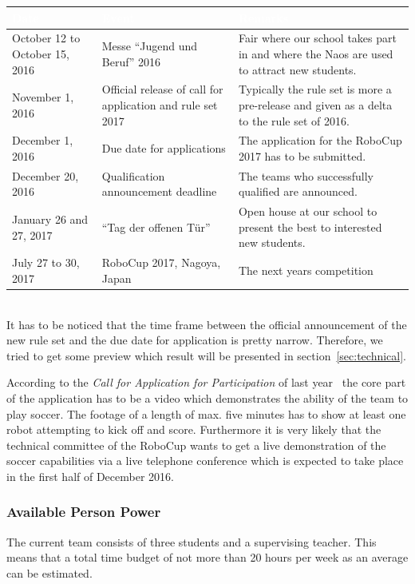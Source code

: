 \documentclass[12pt]{article}
\theoremstyle{definition}
\begin{document}
\begin{tabular}{|p{.21\linewidth}|p{.3\linewidth}|p{.38\linewidth}|}
\cellcolor[gray]{0.5}\textcolor{white}{Date} & \cellcolor[gray]{0.43}\textcolor{white}{Event} & \cellcolor[gray]{0.5}\textcolor{white}{Remarks} \\ \hline
October 12 to October 15, 2016 & Messe ``Jugend und Beruf'' 2016 & Fair where our school takes part in and where the Naos are used to attract new students. \\ \hline
November 1, 2016 & Official release of call for application and rule set 2017 & Typically the rule set is more a pre-release and given as a delta to the rule set of 2016. \\ \hline
December 1, 2016 & Due date for applications & The application for the RoboCup 2017 has to be submitted.\\ \hline
December 20, 2016 & Qualification announcement deadline & The teams who successfully qualified are announced.\\ \hline
January 26 and 27, 2017 & ``Tag der offenen Tür'' & Open house at our school to present the best to interested new students.\\ \hline
July 27 to 30, 2017 & RoboCup 2017, Nagoya, Japan & The next years competition\\ \hline
\end{tabular}
\\

It has to be noticed that the time frame between the official announcement of the new rule set and the due date for application is pretty narrow. Therefore, we tried to get some preview which result will be presented in section~\ref{sec:technical}.

According to the {\em Call for Application for Participation} of last year~\cite{robocup_2016_standard_platform_league_call_2015} the core part of the application has to be a video which demonstrates the ability of the team to play soccer. The footage of a length of max. five minutes has to show at least one robot attempting to kick off and score. Furthermore it is very likely that the technical committee of the RoboCup wants to get a live demonstration of the soccer capabilities via a live telephone conference which is expected to take place in the first half of December 2016.

\subsubsection{Available Person Power}
The current team consists of three students and a supervising teacher. This means that a total time budget of not more than 20 hours per week as an average can be estimated.
\end{document}
